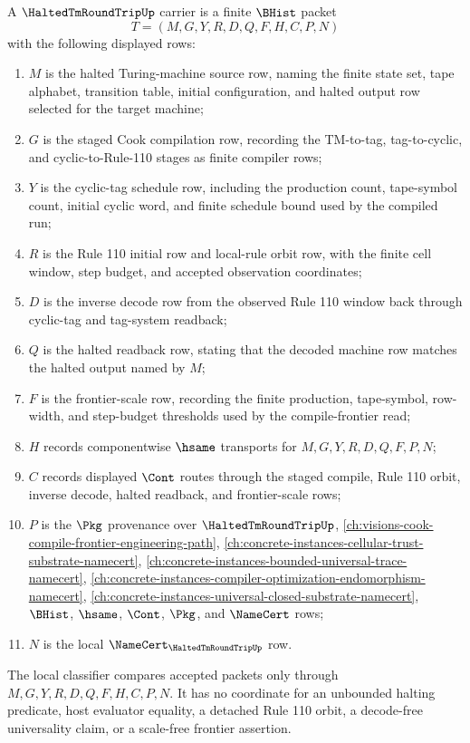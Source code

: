 \begin{definition}
\label{def:halted-tm-round-trip-carrier}
A $\HaltedTmRoundTripUp$ carrier is a finite $\BHist$ packet
$$
T=(M,G,Y,R,D,Q,F,H,C,P,N)
$$
with the following displayed rows:
\begin{enumerate}
\item $M$ is the halted Turing-machine source row, naming the finite state set, tape alphabet, transition table, initial configuration, and halted output row selected for the target machine;
\item $G$ is the staged Cook compilation row, recording the TM-to-tag, tag-to-cyclic, and cyclic-to-Rule-110 stages as finite compiler rows;
\item $Y$ is the cyclic-tag schedule row, including the production count, tape-symbol count, initial cyclic word, and finite schedule bound used by the compiled run;
\item $R$ is the Rule 110 initial row and local-rule orbit row, with the finite cell window, step budget, and accepted observation coordinates;
\item $D$ is the inverse decode row from the observed Rule 110 window back through cyclic-tag and tag-system readback;
\item $Q$ is the halted readback row, stating that the decoded machine row matches the halted output named by $M$;
\item $F$ is the frontier-scale row, recording the finite production, tape-symbol, row-width, and step-budget thresholds used by the compile-frontier read;
\item $H$ records componentwise $\hsame$ transports for $M,G,Y,R,D,Q,F,P,N$;
\item $C$ records displayed $\Cont$ routes through the staged compile, Rule 110 orbit, inverse decode, halted readback, and frontier-scale rows;
\item $P$ is the $\Pkg$ provenance over $\HaltedTmRoundTripUp$, \autoref{ch:visions-cook-compile-frontier-engineering-path}, \autoref{ch:concrete-instances-cellular-trust-substrate-namecert}, \autoref{ch:concrete-instances-bounded-universal-trace-namecert}, \autoref{ch:concrete-instances-compiler-optimization-endomorphism-namecert}, \autoref{ch:concrete-instances-universal-closed-substrate-namecert}, $\BHist$, $\hsame$, $\Cont$, $\Pkg$, and $\NameCert$ rows;
\item $N$ is the local $\NameCert_{\HaltedTmRoundTripUp}$ row.
\end{enumerate}
The local classifier compares accepted packets only through $M,G,Y,R,D,Q,F,H,C,P,N$. It has no coordinate for an unbounded halting predicate, host evaluator equality, a detached Rule 110 orbit, a decode-free universality claim, or a scale-free frontier assertion.
\end{definition}

